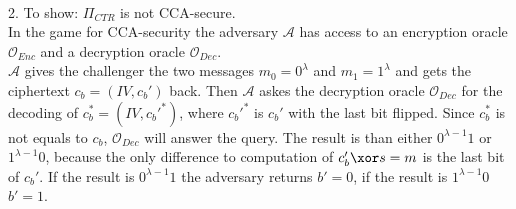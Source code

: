 \\
2. To show: \(\Pi_{CTR}\) is not CCA-secure.\\
In the game for CCA-security the adversary \(\mathcal{A}\) has access to an encryption oracle \(\mathcal{O}_{Enc}\) and a decryption oracle \(\mathcal{O}_{Dec}\). \\
\(\mathcal{A}\) gives the challenger the two messages \(m_0 = 0^\lambda\) and \(m_1 = 1^\lambda\) and gets the ciphertext \(c_b = (IV, c_b')\) back. Then \(\mathcal{A}\) askes the decryption oracle \(\mathcal{O}_{Dec}\) for the decoding of \(c_b^* = (IV, c_b'^*)\), where \(c_b'^*\) is \(c_b'\) with the last bit flipped. Since \(c_b^*\) is not equals to \(c_b\), \(\mathcal{O}_{Dec}\) will answer the query. The result is than either \(0^{\lambda -1}1\) or \(1^{\lambda-1}0\), because the only difference to computation of \(c_b' \xor s = m\) is the last bit of \(c_b'\).
If the result is \(0^{\lambda -1}1\) the adversary returns \(b' = 0\), if the result is \(1^{\lambda-1}0\) \(b' = 1\). 


